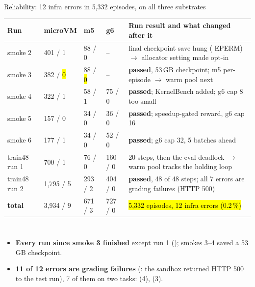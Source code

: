 
\begin{frame}{Reliability: 12 infra errors in 5,332 episodes, on all three substrates}
\scriptsize\setlength{\tabcolsep}{4pt}
\begin{tabularx}{\textwidth}{@{}P{0.11\textwidth}P{0.12\textwidth}P{0.10\textwidth}P{0.10\textwidth}Y@{}}
\toprule
\textbf{Run} & \textbf{\textcolor{cat2}{microVM}} & \textbf{\textcolor{cat1}{m5}} & \textbf{\textcolor{cat3}{g6}} & \textbf{Run result and what changed after it}\\
\midrule
smoke 2 & 401 / 1 & 88 / 0 & -- & final checkpoint save hung ( EPERM) $\rightarrow$ allocator setting made opt-in\\
smoke 3 & 382 / \hl{0} & 88 / \hl{0} & -- & \textbf{passed}, 53\,GB checkpoint; m5 per-episode $\rightarrow$ warm pool next\\
smoke 4 & 322 / 1 & 58 / 1 & 75 / 0 & \textbf{passed}; KernelBench added; g6 cap 8 too small\\
smoke 5 & 157 / 0 & 34 / 0 & 36 / 0 & \textbf{passed}; speedup-gated reward, g6 cap 16\\
smoke 6 & 177 / 1 & 34 / 0 & 52 / 0 & \textbf{passed}; g6 cap 32, 5 batches ahead\\
train48 run 1 & 700 / 1 & 76 / 0 & 160 / 0 & 20 steps, then the eval deadlock $\rightarrow$ warm pool tracks the holding loop\\
train48 run 2 & 1{,}795 / 5 & 293 / 2 & 404 / 0 & \textbf{passed}, 48 of 48 steps; all 7 errors are grading failures (HTTP 500)\\
\midrule
\textbf{total} & 3{,}934 / 9 & 671 / 3 & 727 / 0 & \hl{5{,}332 episodes, 12 infra errors (0.2\,\%)}\\
\bottomrule
\end{tabularx}
\par\vspace{2mm}
\begin{columns}[T]
\begin{itemize}\scriptsize\setlength{\itemsep}{0.8mm}
\item \textbf{Every run since smoke 3 finished} except  run 1 (); smokes 3--4 saved a 53\,GB checkpoint.
\item \textbf{11 of 12 errors are grading failures} (: the sandbox returned HTTP 500 to the test run), 7 of them on two tasks:  (4),  (3).

\end{itemize}
\end{columns}
\end{frame}
